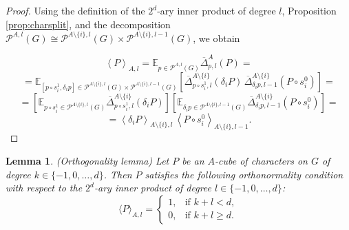 \documentclass{amsart}
\newtheorem{lemma}[theorem]{Lemma}
\theoremstyle{definition}
\theoremstyle{remark}
\numberwithin{equation}{section}
\begin{document}
\begin{proof}
Using the definition of the $2^d$-ary inner product of degree $l$, Proposition \ref{prop:charsplit}, and the decomposition $\mathcal{P}^{A,l}(G) \cong  \mathcal{P}^{A\setminus\{i\},l}(G) \times \mathcal{P}^{A\setminus\{i\},l-1}(G)$, we obtain

$$\left\langle P \right\rangle_{A,l} = \mathbb{E}_{p \in \mathcal{P}^{A,l}(G)} \overline{\Delta}^A_{p,l} (P) = $$ 
$$= \mathbb{E}_{[p \circ s_i^1   ,\delta_i p] \in \mathcal{P}^{A\setminus\{i\},l}(G) \times \mathcal{P}^{A\setminus\{i\},l-1}(G)}   \left[  \overline{\Delta}^{A \setminus \{i\}}_{p\circ s_i^1 ,l} (\delta_i P) \, \overline{\Delta}^{A \setminus \{i\}}_{\delta_i p,l-1}(P \circ s_i^0  ) \right] = 
$$
$$= \left[ \mathbb{E}_{p \circ s_i^1   \in \mathcal{P}^{A\setminus\{i\},l}(G)}     \overline{\Delta}^{A \setminus \{i\}}_{p \circ s_i^1  ,l} (\delta_i P)\right ]  \left[  \mathbb{E}_{\delta_i p  \in \mathcal{P}^{A\setminus\{i\},l-1}(G)}   \overline{\Delta}^{A \setminus \{i\}}_{\delta_i p,l-1}(P \circ s_i^0  ) \right] = $$
$$ = \left\langle \delta_i P \right\rangle_{A\setminus \{i\},l} \,
\left\langle P \circ s_i^0 \right\rangle_{A \setminus \{i\},l-1}.$$

\end{proof}


 
 
 


\begin{lemma}
\label{lem:orth}
 {\it (Orthogonality lemma)}
Let $P$ be an  $A$-cube of characters on $G$ of degree $k\in \{-1, 0, \dots, d \}$. Then $P$  satisfies the following orthonormality condition with respect to the $2^d$-ary inner product of degree $l\in \{-1, 0, \dots, d \}$:
$$ \langle P \rangle_{A,l} = \begin{cases} 1, & \text{if } k + l < d, \\ 0, & \text{if } k + l \ge d. \end{cases}$$
\end{lemma}
\end{document}

